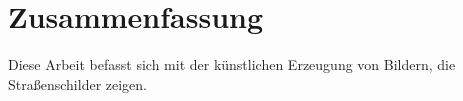\chapter{Zusammenfassung}

Diese Arbeit befasst sich mit der künstlichen Erzeugung von Bildern, die Straßenschilder zeigen.

